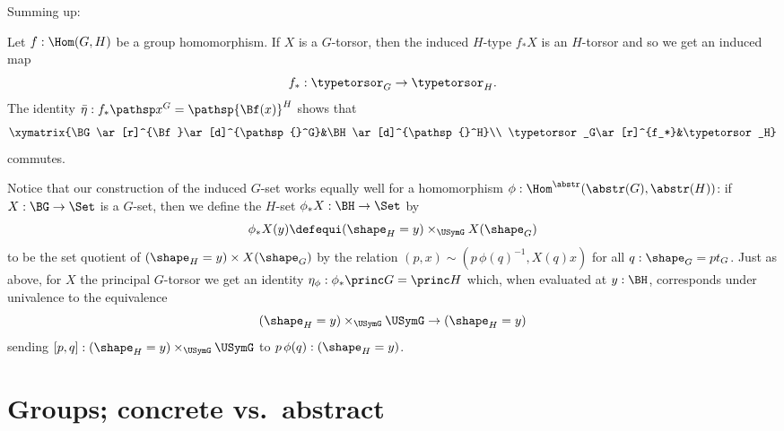 Summing up:
\begin{lemma}
  \label{lem:inducedtorsor}
   Let $f:\Hom(G,H)$ be a group homomorphism.
   If $X$ is a $G$-torsor, then the induced $H$-type $f_*X$ is an $H$-torsor and so we get an induced map
   $$f_*:\typetorsor_G\to\typetorsor_H.$$
   The identity
$\bar{\eta}:f_*\pathsp x^G=\pathsp{\Bf(x)}^H$
shows that
$$\xymatrix{\BG\ar[r]^{\Bf}\ar[d]^{\pathsp{}^G}&\BH\ar[d]^{\pathsp{}^H}\\
\typetorsor_G\ar[r]^{f_*}&\typetorsor_H}$$
commutes.
\end{lemma}
\begin{remark}
  \label{rem:inducedGsetfromabstracthomomorphisms}
  Notice that our construction of the induced $G$-set works equally well for a homomorphism $\phi:\Hom^\abstr(\abstr(G),\abstr(H))$:
  if $X:\BG\to\Set$ is a $G$-set, then we define the $H$-set $\phi_*X:\BH\to\Set$ by
  $$\phi_*X(y)\defequi(\shape_H=y)\times_{\USymG}X(\shape_G)$$
  to be the set quotient of $(\shape_H=y)\times X(\shape_G)$ by the relation $(p,x)\sim(p\, \phi(q)^{-1},X(q)x)$ for all $q:\shape_G=pt_G$.
  Just as above, for $X$ the principal $G$-torsor we get an identity  $\eta_\phi:\phi_*\princ G=\princ H$ which, when evaluated at $y:\BH$, corresponds under univalence to the equivalence
$$(\shape_H=y)\times_{\USymG}\USymG\to (\shape_H=y)$$
sending $[p,q]:(\shape_H=y)\times_{\USymG}\USymG$ to $p\,\phi(q):(\shape_H=y)$.
\end{remark}


\section{Groups; concrete vs.~abstract%
}
\label{sec:Gsetforabstract}

